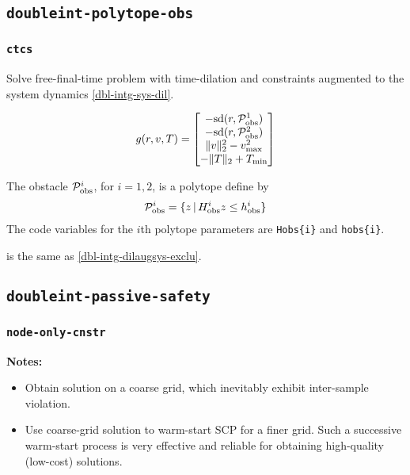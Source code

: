 \documentclass[11pt,a4paper]{article}
\begin{document}
\subsection{\texttt{doubleint-polytope-obs}}

\subsubsection{\texttt{ctcs}}

Solve free-final-time problem with time-dilation and constraints augmented to the system dynamics \eqref{dbl-intg-sys-dil}.

\begin{align*}
    g(r,v,T) = \begin{bmatrix}
                  -\mathrm{sd}(r,\mathcal{P}^1_{\mathrm{obs}})\\
                  -\mathrm{sd}(r,\mathcal{P}^2_{\mathrm{obs}})\\
                  \|v\|_2^2 - v_{\max}^2\\
                  -\|T\|_2 + T_{\min}
               \end{bmatrix}
\end{align*}

The obstacle $\mathcal{P}^i_{\mathrm{obs}}$, for $i=1,2$, is a polytope define by
\begin{align*}
    \mathcal{P}^i_{\mathrm{obs}} = \{z\,|\,H^i_{\mathrm{obs}}z \le h^i_{\text{obs}}\}
\end{align*}
The code variables for the $i$th polytope parameters are \verb|Hobs{i}| and \verb|hobs{i}|.

 is the same as \eqref{dbl-intg-dilaugsys-exclu}.

\subsection{\texttt{doubleint-passive-safety}}

\subsubsection{\texttt{node-only-cnstr}}

\textbf{Notes:}
\begin{itemize}
    \item Obtain solution on a coarse grid, which inevitably exhibit inter-sample violation.
    \item Use coarse-grid solution to warm-start SCP for a finer grid. Such a successive warm-start process is very effective and reliable for obtaining high-quality (low-cost) solutions.
\end{itemize}
\end{document}

